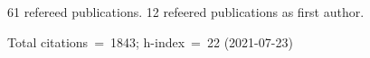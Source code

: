61 refereed publications. 12 refeered publications as first author.

Total citations~=~1843; h-index~=~22 (2021-07-23)